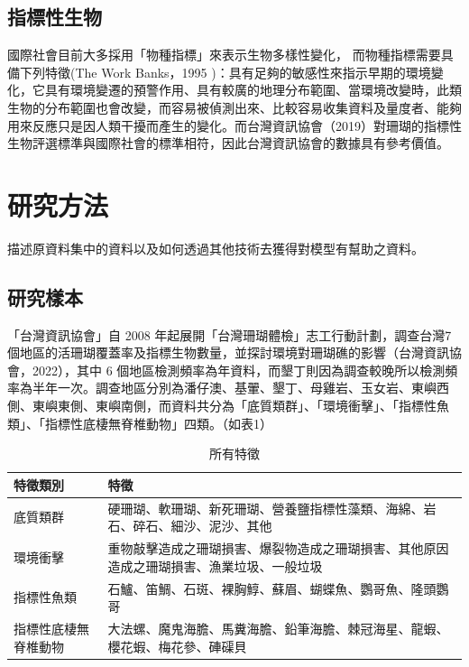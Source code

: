 \documentclass[12pt]{ctexart}
\begin{document}
\subsection{指標性生物}
國際社會目前大多採用「物種指標」來表示生物多樣性變化， 而物種指標需要具備下列特徵(The Work Banks，1995 )：具有足夠的敏感性來指示早期的環境變化，它具有環境變遷的預警作用、具有較廣的地理分布範圍、當環境改變時，此類生物的分布範圍也會改變，而容易被偵測出來、比較容易收集資料及量度者、能夠用來反應只是因人類干擾而產生的變化。而台灣資訊協會（2019）對珊瑚的指標性生物評選標準與國際社會的標準相符，因此台灣資訊協會的數據具有參考價值。

\section{研究方法}
描述原資料集中的資料以及如何透過其他技術去獲得對模型有幫助之資料。

\subsection{研究樣本}

「台灣資訊協會」自 2008 年起展開「台灣珊瑚體檢」志工行動計劃，調查台灣7個地區的活珊瑚覆蓋率及指標生物數量，並探討環境對珊瑚礁的影響（台灣資訊協會，2022），其中 6 個地區檢測頻率為年資料，而墾丁則因為調查較晚所以檢測頻率為半年一次。調查地區分別為潘仔澳、基翬、墾丁、母雞岩、玉女岩、東嶼西側、東嶼東側、東嶼南側，而資料共分為「底質類群」、「環境衝擊」、「指標性魚類」、「指標性底棲無脊椎動物」四類。（如表1）

\begin{table}[H]
    \centering
    \caption{所有特徵}
    \vspace{2mm}
    \begin{tabularx}{\textwidth}{|l|X|}
        \hline
        \textbf{特徵類別} & \textbf{特徵} \\ \hline
        底質類群 & 硬珊瑚、軟珊瑚、新死珊瑚、營養鹽指標性藻類、海綿、岩石、碎石、細沙、泥沙、其他 \\ \hline
        環境衝擊 & 重物敲擊造成之珊瑚損害、爆裂物造成之珊瑚損害、其他原因造成之珊瑚損害、漁業垃圾、一般垃圾 \\ \hline
        指標性魚類 & 石鱸、笛鯛、石斑、裸胸鯙、蘇眉、蝴蝶魚、鸚哥魚、隆頭鸚哥 \\ \hline
        指標性底棲無脊椎動物 & 大法螺、魔鬼海膽、馬糞海膽、鉛筆海膽、棘冠海星、龍蝦、櫻花蝦、梅花參、硨磲貝 \\ \hline
    \end{tabularx}
\end{table}
\end{document}
